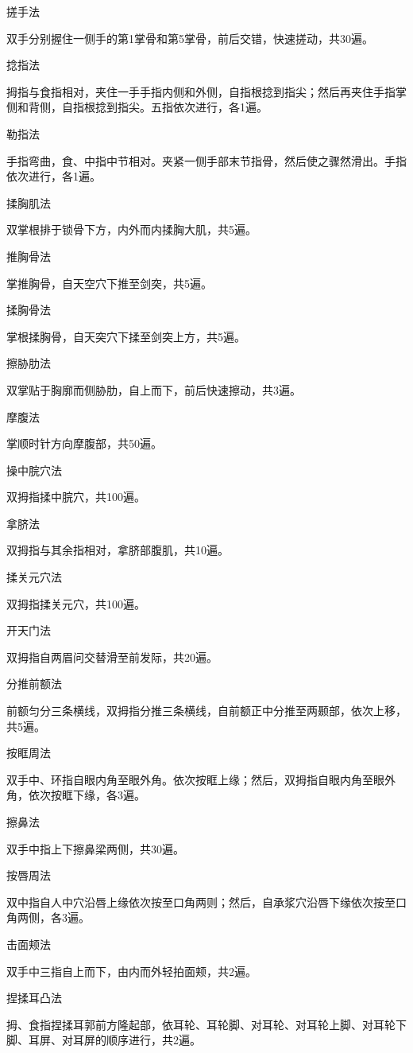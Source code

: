 \documentclass[12pt,UTF8]{ctexbook}
\begin{document}
搓手法

双手分别握住一侧手的第1掌骨和第5掌骨，前后交错，快速搓动，共30遍。

捻指法

拇指与食指相对，夹住一手手指内侧和外侧，自指根捻到指尖；然后再夹住手指掌侧和背侧，自指根捻到指尖。五指依次进行，各1遍。

勒指法

手指弯曲，食、中指中节相对。夹紧一侧手部末节指骨，然后使之骤然滑出。手指依次进行，各1遍。

揉胸肌法

双掌根排于锁骨下方，内外而内揉胸大肌，共5遍。

推胸骨法

掌推胸骨，自天空穴下推至剑突，共5遍。

揉胸骨法

掌根揉胸骨，自天突穴下揉至剑突上方，共5遍。

擦胁肋法

双掌贴于胸廓而侧胁肋，自上而下，前后快速擦动，共3遍。

摩腹法

掌顺时针方向摩腹部，共50遍。

操中脘穴法

双拇指揉中脘穴，共100遍。

拿脐法

双拇指与其余指相对，拿脐部腹肌，共10遍。

揉关元穴法

双拇指揉关元穴，共100遍。

开天门法

双拇指自两眉问交替滑至前发际，共20遍。

分推前额法

前额匀分三条横线，双拇指分推三条横线，自前额正中分推至两颞部，依次上移，共5遍。

按眶周法

双手中、环指自眼内角至眼外角。依次按眶上缘；然后，双拇指自眼内角至眼外角，依次按眶下缘，各3遍。

擦鼻法

双手中指上下擦鼻梁两侧，共30遍。

按唇周法

双中指自人中穴沿唇上缘依次按至口角两则；然后，自承浆穴沿唇下缘依次按至口角两侧，各3遍。

击面颊法

双手中三指自上而下，由内而外轻拍面颊，共2遍。

捏揉耳凸法

拇、食指捏揉耳郭前方隆起部，依耳轮、耳轮脚、对耳轮、对耳轮上脚、对耳轮下脚、耳屏、对耳屏的顺序进行，共2遍。
\end{document}
